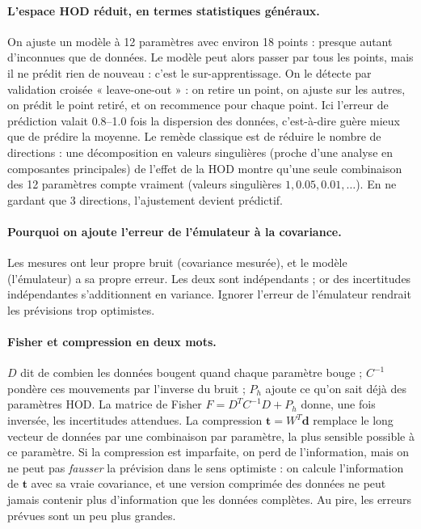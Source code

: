 \paragraph{L'espace HOD réduit, en termes statistiques généraux.} On ajuste un modèle à 12 paramètres avec environ 18 points : presque autant d'inconnues que de données. Le modèle peut alors passer par tous les points, mais il ne prédit rien de nouveau : c'est le sur-apprentissage. On le détecte par validation croisée « leave-one-out » : on retire un point, on ajuste sur les autres, on prédit le point retiré, et on recommence pour chaque point. Ici l'erreur de prédiction valait 0.8--1.0 fois la dispersion des données, c'est-à-dire guère mieux que de prédire la moyenne. Le remède classique est de réduire le nombre de directions : une décomposition en valeurs singulières (proche d'une analyse en composantes principales) de l'effet de la HOD montre qu'une seule combinaison des 12 paramètres compte vraiment (valeurs singulières $1, 0.05, 0.01, \dots$). En ne gardant que 3 directions, l'ajustement devient prédictif.

\paragraph{Pourquoi on ajoute l'erreur de l'émulateur à la covariance.} Les mesures ont leur propre bruit (covariance mesurée), et le modèle (l'émulateur) a sa propre erreur. Les deux sont indépendants ; or des incertitudes indépendantes s'additionnent en variance. Ignorer l'erreur de l'émulateur rendrait les prévisions trop optimistes.

\paragraph{Fisher et compression en deux mots.} $D$ dit de combien les données bougent quand chaque paramètre bouge ; $C^{-1}$ pondère ces mouvements par l'inverse du bruit ; $P_h$ ajoute ce qu'on sait déjà des paramètres HOD. La matrice de Fisher $F = D^TC^{-1}D + P_h$ donne, une fois inversée, les incertitudes attendues. La compression $\boldsymbol t = W^T\boldsymbol d$ remplace le long vecteur de données par une combinaison par paramètre, la plus sensible possible à ce paramètre. Si la compression est imparfaite, on perd de l'information, mais on ne peut pas \emph{fausser} la prévision dans le sens optimiste : on calcule l'information de $\boldsymbol t$ avec sa vraie covariance, et une version comprimée des données ne peut jamais contenir plus d'information que les données complètes. Au pire, les erreurs prévues sont un peu plus grandes.

